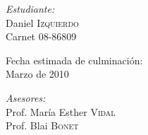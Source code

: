 \begin{titlepage}
\begin{minipage}{0.3\textwidth}
\begin{flushleft}
\emph{Estudiante:} \\
Daniel \textsc{Izquierdo} \\
Carnet 08-86809 \\
\end{flushleft}
\end{minipage}
\begin{minipage}{0.3\textwidth}
\begin{center}
Fecha estimada de culminación: \\
Marzo de 2010
\end{center}
\end{minipage}
\begin{minipage}{0.3\textwidth}
\begin{flushright}
\emph{Asesores:} \\
Prof. María Esther \textsc{Vidal} \\
Prof. Blai \textsc{Bonet}
\end{flushright}
\end{minipage}

\end{titlepage}
